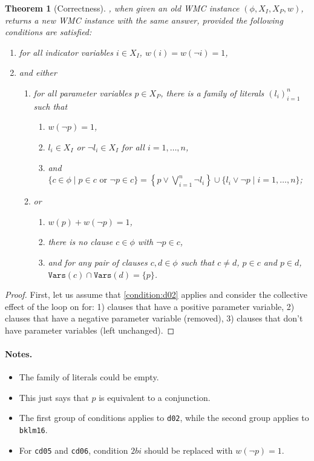 \documentclass{article}
\newtheorem{theorem}{Theorem}
\theoremstyle{definition}
\theoremstyle{remark}
\begin{document}
\begin{theorem}[Correctness]
  , when given an old WMC instance $(\phi, X_I, X_P,
  w)$, returns a new WMC instance with the same answer, provided the following
  conditions are satisfied:
  \begin{enumerate}
  \item for all indicator variables $i \in X_I$, $w(i) = w(\neg i) = 1$,
  \item and either
    \begin{enumerate}
    \item for all parameter variables $p \in X_P$, there is a family of literals
      $(l_i)_{i=1}^n$ such that \label{condition:d02}
      \begin{enumerate}
      \item $w(\neg p) = 1$,
      \item $l_i \in X_I$ or $\neg l_i \in X_I$ for all $i = 1, \dots, n$,
      \item and $\{ c \in \phi \mid p \in c \text{ or } \neg p \in c \} =
        \left\{p \lor \bigvee_{i=1}^n \neg l_i \right\} \cup \{ l_i \lor \neg p
        \mid i = 1, \dots, n \}$;
      \end{enumerate}
    \item or \label{condition:bklm16}
      \begin{enumerate}
      \item $w(p) + w(\neg p) = 1$,
      \item there is no clause $c \in \phi$ with $\neg p \in c$,
      \item and for any pair of clauses $c, d \in \phi$ such that $c \ne d$, $p
        \in c$ and $p \in d$, $\mathtt{Vars}(c) \cap \mathtt{Vars}(d) = \{ p
        \}$.
      \end{enumerate}
    \end{enumerate}
  \end{enumerate}
\end{theorem}
\begin{proof}
  First, let us assume that \cref{condition:d02} applies and consider the
  collective effect of the loop on
   for: 1) clauses that have a
  positive parameter variable, 2) clauses that have a negative parameter
  variable (removed), 3) clauses that don't have parameter variables (left
  unchanged).
\end{proof}

\paragraph{Notes.}
\begin{itemize}
\item The family of literals could be empty.
\item This just says that $p$ is equivalent to a conjunction.
\item The first group of conditions applies to \texttt{d02}, while the second
  group applies to \texttt{bklm16}.
\item For \texttt{cd05} and \texttt{cd06}, condition $2bi$ should be replaced
  with $w(\neg p) = 1$.
\end{itemize}
\end{document}
